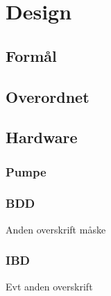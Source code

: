 \chapter{Design}

\section{Formål}

\section{Overordnet}


\section{Hardware}
\subsection{Pumpe}
\subsection{BDD}
Anden overskrift måske
\subsection{IBD}
Evt anden overskrift

\newpage
